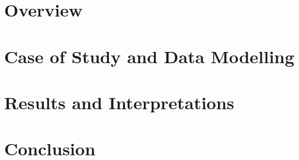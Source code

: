 \documentclass[fontsize=14pt,paper=a4,pagesize=auto]{report}
\begin{document}
\chapter{Overview}
 \label{chap:Overview}
 

\chapter{Case of Study and Data Modelling }
 \label{chap:case}


\chapter{Results and Interpretations }
 \label{chap:res}


\chapter{Conclusion}
\label{chap:conclusion}


\appendix



       
\end{document}
